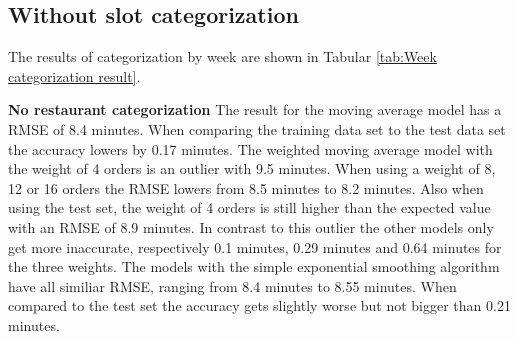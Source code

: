 \subsection{Without slot categorization}
The results of categorization by week are shown in Tabular \ref{tab:Week categorization result}.
\begin{table}[h]
\centering
\caption{Week categorization without slot}
\label{tab:Week categorization result}
\end{table}
\newline\newline\textbf{No restaurant categorization}\newline
The result for the moving average model has a RMSE of 8.4 minutes. When comparing the training data set to the test data set the accuracy lowers by 0.17 minutes. The weighted moving average model with the weight of 4 orders is an outlier with 9.5 minutes. When using a weight of 8, 12 or 16 orders the RMSE lowers from 8.5 minutes to 8.2 minutes. Also when using the test set, the weight of 4 orders is still higher than the expected value with an RMSE of 8.9 minutes. In contrast to this outlier the other models only get more inaccurate, respectively 0.1 minutes, 0.29 minutes and 0.64 minutes for the three weights. The models with the simple exponential smoothing algorithm have all similiar RMSE, ranging from 8.4 minutes to 8.55 minutes. When compared to the test set the accuracy gets slightly worse but not bigger than 0.21 minutes.\newline
